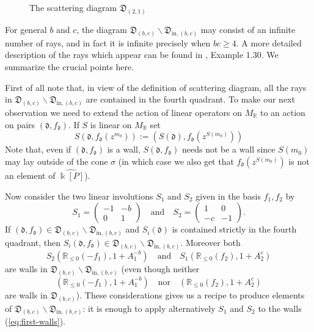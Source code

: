 \documentclass[11pt]{amsart}
\theoremstyle{remark}
\numberwithin{equation}{section}
\newcommand{\RR}{\mathbb{R}}
\newcommand{\dd}{\mathfrak{d}}
\newcommand{\DD}{\mathfrak{D}}
\begin{document}
\begin{figure}
  \centering
  \caption{The scattering diagram $\DD_{(2,1)}$} 
  \label{fig:diagex}
\end{figure}

For general $b$ and $c$, the diagram $\DD_{(b,c)} \backslash
\DD_{\mathrm{in},(b,c)}$ may consist of an infinite number of rays, and in fact
it is infinite precisely when $bc\ge 4$. A more detailed description of the rays
which appear can be found in \cite{GHKK}, Example 1.30. We summarize the crucial
points here.

First of all note that, in view of the definition of scattering diagram, all the
rays in  $\DD_{(b,c)} \backslash \DD_{\mathrm{in},(b,c)}$ are contained in the
fourth quadrant.  To make our next observation we need to extend the action of
linear operators on $M_\RR$ to an action on pairs $(\dd,f_\dd)$. If $S$ is
linear on $M_\RR$ set
\begin{equation}
  \label{eqn:linear action}
  S(\dd,f_\dd(z^{m_0}))
  :=
  \left( S(\dd), f_\dd(z^{S(m_0)}) \right)
\end{equation}
Note that, even if $(\dd,f_\dd)$ is a wall, $S(\dd,f_\dd)$ needs not be a wall
since $S(m_0)$ may lay outside of the cone $\sigma$ (in which case we also get
that  $f_\dd(z^{S(m_0)})$ is not an element of $\widehat{\Bbbk [P]}$).

Now consider the two linear involutions $S_1$ and $S_2$ given in the basis $f_1,
f_2$ by
\[
  S_1 =  
  \begin{pmatrix}
    -1 & -b \\
    0& 1
  \end{pmatrix}
  \quad
  \mbox{and}
  \quad
  S_2 =  
  \begin{pmatrix}
    1 & 0 \\
    -c & -1
  \end{pmatrix}.
\]
If $(\dd, f_{\dd}) \in \DD_{(b,c)} \backslash \DD_{\mathrm{in},(b,c)}$ and $S_i
(\dd)$ is contained strictly in the fourth quadrant, then $S_i(\dd, f_{\dd}) \in
\DD_{(b,c)} \backslash \DD_{\mathrm{in},(b,c)}$. Moreover both 
\begin{equation}
  \label{eq:first-walls}
  S_2(\RR_{\leq 0}(-f_1),1+A_1^{-b})
  \quad
  \mbox{and}
  \quad
  S_1(\RR_{\leq 0}(f_2),1+A_2^c)
\end{equation}
are walls in $\DD_{(b,c)} \backslash \DD_{\mathrm{in},(b,c)}$ (even though
neither 
\[
  (\RR_{\leq 0}(-f_1),1+A_1^{-b})
  \quad
  \mbox{nor}
  \quad
  (\RR_{\leq 0}(f_2),1+A_2^c)
\]
are walls in $\DD_{(b,c)}$). These considerations gives us a recipe to produce
elements of $\DD_{(b,c)} \backslash \DD_{\mathrm{in},(b,c)}$: it is enough to apply
alternatively $S_1$ and $S_2$ to the walls (\ref{eq:first-walls}).
\end{document}
